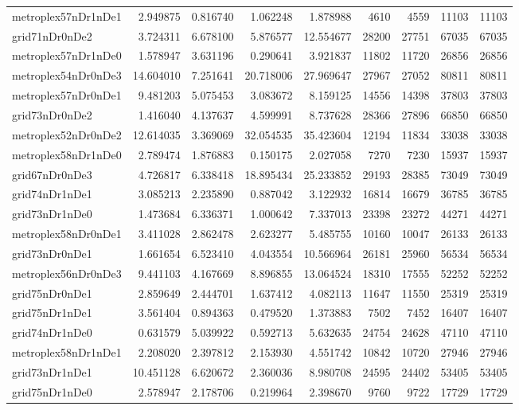 \begin{longtable}{|l|r|r|r|r|r|r|r|r|}
metroplex57nDr1nDe1 & 2.949875 & 0.816740 & 1.062248 & 1.878988 & 4610 & 4559 & 11103 & 11103 \\
grid71nDr0nDe2 & 3.724311 & 6.678100 & 5.876577 & 12.554677 & 28200 & 27751 & 67035 & 67035 \\
metroplex57nDr1nDe0 & 1.578947 & 3.631196 & 0.290641 & 3.921837 & 11802 & 11720 & 26856 & 26856 \\
metroplex54nDr0nDe3 & 14.604010 & 7.251641 & 20.718006 & 27.969647 & 27967 & 27052 & 80811 & 80811 \\
metroplex57nDr0nDe1 & 9.481203 & 5.075453 & 3.083672 & 8.159125 & 14556 & 14398 & 37803 & 37803 \\
grid73nDr0nDe2 & 1.416040 & 4.137637 & 4.599991 & 8.737628 & 28366 & 27896 & 66850 & 66850 \\
metroplex52nDr0nDe2 & 12.614035 & 3.369069 & 32.054535 & 35.423604 & 12194 & 11834 & 33038 & 33038 \\
metroplex58nDr1nDe0 & 2.789474 & 1.876883 & 0.150175 & 2.027058 & 7270 & 7230 & 15937 & 15937 \\
grid67nDr0nDe3 & 4.726817 & 6.338418 & 18.895434 & 25.233852 & 29193 & 28385 & 73049 & 73049 \\
grid74nDr1nDe1 & 3.085213 & 2.235890 & 0.887042 & 3.122932 & 16814 & 16679 & 36785 & 36785 \\
grid73nDr1nDe0 & 1.473684 & 6.336371 & 1.000642 & 7.337013 & 23398 & 23272 & 44271 & 44271 \\
metroplex58nDr0nDe1 & 3.411028 & 2.862478 & 2.623277 & 5.485755 & 10160 & 10047 & 26133 & 26133 \\
grid73nDr0nDe1 & 1.661654 & 6.523410 & 4.043554 & 10.566964 & 26181 & 25960 & 56534 & 56534 \\
metroplex56nDr0nDe3 & 9.441103 & 4.167669 & 8.896855 & 13.064524 & 18310 & 17555 & 52252 & 52252 \\
grid75nDr0nDe1 & 2.859649 & 2.444701 & 1.637412 & 4.082113 & 11647 & 11550 & 25319 & 25319 \\
grid75nDr1nDe1 & 3.561404 & 0.894363 & 0.479520 & 1.373883 & 7502 & 7452 & 16407 & 16407 \\
grid74nDr1nDe0 & 0.631579 & 5.039922 & 0.592713 & 5.632635 & 24754 & 24628 & 47110 & 47110 \\
metroplex58nDr1nDe1 & 2.208020 & 2.397812 & 2.153930 & 4.551742 & 10842 & 10720 & 27946 & 27946 \\
grid73nDr1nDe1 & 10.451128 & 6.620672 & 2.360036 & 8.980708 & 24595 & 24402 & 53405 & 53405 \\
grid75nDr1nDe0 & 2.578947 & 2.178706 & 0.219964 & 2.398670 & 9760 & 9722 & 17729 & 17729 \\

\end{longtable}
